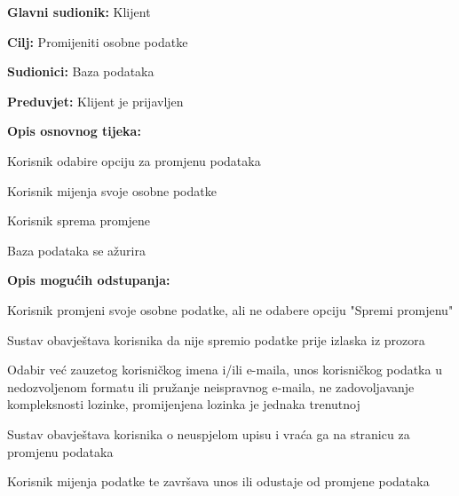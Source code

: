 					\noindent {}
					\begin{packed_item}
	
						\item \textbf{Glavni sudionik: } Klijent
						\item  \textbf{Cilj:} Promijeniti osobne podatke
						\item  \textbf{Sudionici:} Baza podataka
						\item  \textbf{Preduvjet:} Klijent je prijavljen
						\item  \textbf{Opis osnovnog tijeka:}
						
						\item[] \begin{packed_enum}
	
							\item Korisnik odabire opciju za promjenu podataka
							\item Korisnik mijenja svoje osobne podatke
							\item Korisnik sprema promjene
							\item Baza podataka se ažurira

						\end{packed_enum}
						
						\item  \textbf{Opis mogućih odstupanja:}
						
						\item[] \begin{packed_item}
	
							\item[2.a] Korisnik promjeni svoje osobne podatke, ali ne odabere opciju "Spremi promjenu"
							\item[] \begin{packed_enum}
								
								\item Sustav obavještava korisnika da nije spremio podatke prije izlaska iz prozora

							\end{packed_enum}
							\item[2.b] Odabir već zauzetog korisničkog imena i/ili e-maila, unos korisničkog podatka u nedozvoljenom formatu ili pružanje neispravnog e-maila, ne zadovoljavanje kompleksnosti lozinke, promijenjena lozinka je jednaka trenutnoj
							\item[] \begin{packed_enum}
								
								\item Sustav obavještava korisnika o neuspjelom upisu i vraća ga na stranicu za promjenu podataka
								\item Korisnik mijenja podatke te završava unos ili odustaje od promjene podataka
								
							\end{packed_enum}
							
							
						\end{packed_item}
					\end{packed_item}
					
